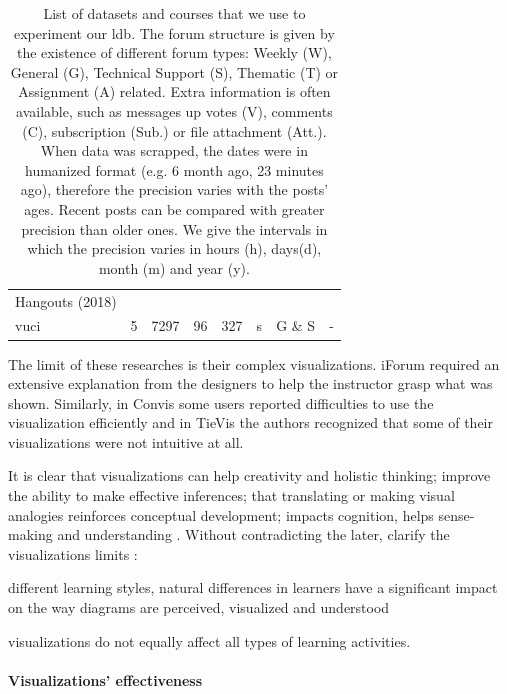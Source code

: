 \documentclass[a4paper,twoside]{article}
\begin{document}
\begin{table}[t]
\begin{tabular}{lllrrllp{}}
  Hangouts (2018) & & & \multicolumn{1}{l}{} & \multicolumn{1}{l}{} & & & \\ [.2cm]
  \gls{vuci} & \multicolumn{1}{r}{5} & \multicolumn{1}{r}{7297} & 96 & 327 & \multicolumn{1}{l}{s} & G \& S & - \\  \bottomrule
 \end{tabular}
 \caption{\label{tab:datasets}List of datasets and courses that we use to experiment our \gls{ldb}.  The forum structure is given by the existence of different forum types: Weekly (W), General (G), Technical Support (S), Thematic (T) or Assignment (A) related.  Extra information is often available, such as messages up votes (V), comments (C), subscription (Sub.) or file attachment (Att.).  When data was scrapped, the dates were in humanized format (e.g.  6 month ago, 23 minutes ago), therefore the precision varies with the posts' ages.  Recent posts can be compared with greater precision than older ones.  We give the intervals in which the precision varies in hours (h), days(d), month (m) and year (y).}
\end{table}


The limit of these researches is their complex visualizations.  iForum required an extensive explanation from the designers to help the instructor grasp what was shown.  Similarly, in Convis some users reported difficulties to use the visualization efficiently and in TieVis the authors recognized that some of their visualizations were not intuitive at all.

It is clear that visualizations can help creativity and holistic thinking; improve the ability to make effective inferences; that translating or making visual analogies reinforces conceptual development; impacts cognition, helps sense-making and understanding \citep{Klerkx2014}.  Without contradicting the later, \cite{Twissell2014} clarify the visualizations limits : 
\begin{inparaenum}
\item different learning styles, natural differences in learners have a significant impact on the way diagrams are perceived, visualized and understood
\item visualizations do not equally affect all types of learning activities.
\end{inparaenum}



\paragraph{Visualizations' effectiveness}
\end{document}
